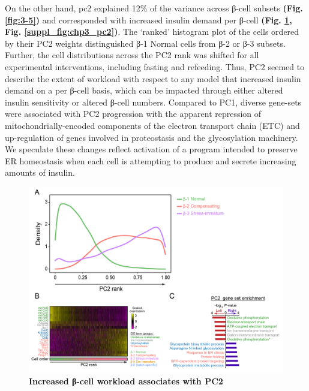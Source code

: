 
On the other hand, \gls{pc}2 explained 12\% of the variance across β-cell subsets \textbf{(Fig. \ref{fig:3-5})} and corresponded with increased insulin demand per β-cell \textbf{(Fig. \ref{fig:3-7}, Fig. \ref{suppl_fig:chp3_pc2})}. The ‘ranked’ histogram plot of the cells ordered by their PC2 weights distinguished β-1 Normal cells from β-2 or β-3 subsets. Further, the cell distributions across the PC2 rank was shifted for all experimental interventions, including fasting and refeeding. Thus, PC2 seemed to describe the extent of workload with respect to any model that increased insulin demand on a per β-cell basis, which can be impacted through either altered insulin sensitivity or altered β-cell numbers. Compared to PC1, diverse gene-sets were associated with PC2 progression with the apparent repression of mitochondrially-encoded components of the electron transport chain (ETC) and up-regulation of genes involved in proteostasis and the glycosylation machinery. We speculate these changes reflect activation of a program intended to preserve ER homeostasis when each cell is attempting to produce and secrete increasing amounts of insulin.\\

\begin{figure}[H]
\centering
\includegraphics[width=\linewidth]{Chapter5/Fig/F3-6-03}
\caption[Increased β-cell workload associates with PC2]{\textbf{Increased β-cell workload associates with PC2}\\}
\label{fig:3-7}
\end{figure}

\clearpage

